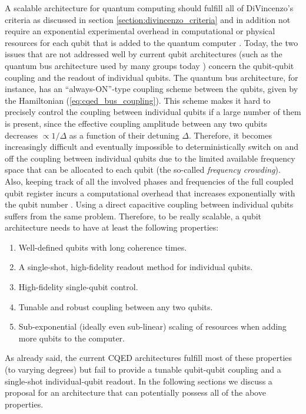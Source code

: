 A scalable architecture for quantum computing should fulfill all of DiVincenzo's criteria as discussed in section \ref{section:divincenzo_criteria} and in addition not require an exponential experimental overhead in computational or physical resources for each qubit that is added to the quantum computer \citep{blume-kohout_climbing_2002}. Today, the two issues that are not addressed well by current qubit architectures (such as the quantum bus architecture used by many groups today \citep{dicarlo_demonstration_2009,wallraff_strong_2004}) concern the qubit-qubit coupling and the readout of individual qubits. The quantum bus architecture, for instance, has an ``always-ON''-type coupling scheme between the qubits, given by the Hamiltonian (\ref{eq:cqed_bus_coupling}). This scheme makes it hard to precisely control the coupling between individual qubits if a large number of them is present, since the effective coupling amplitude between any two qubits decreases $\propto 1/\Delta$ as a function of their detuning $\Delta$. Therefore, it becomes increasingly difficult and eventually impossible to deterministically switch on and off the coupling between individual qubits due to the limited available frequency space that can be allocated to each qubit (the so-called {\it frequency crowding}). Also, keeping track of all the involved phases and frequencies of the full coupled qubit register incurs a computational overhead that increases exponentially with the qubit number \citep{galiautdinov_resonatorzero-qubit_2012}. Using a direct capacitive coupling between individual qubits suffers from the same problem. Therefore, to be really scalable, a qubit architecture needs to have at least the following properties:

\begin{enumerate}
\item Well-defined qubits with long coherence times.
\item A single-shot, high-fidelity readout method for individual qubits.
\item High-fidelity single-qubit control.
\item Tunable and robust coupling between any two qubits.
\item Sub-exponential (ideally even sub-linear) scaling of resources when adding more qubits to the computer.
\end{enumerate}

As already said, the current CQED architectures fulfill most of these properties (to varying degrees) but fail to provide a tunable qubit-qubit coupling and a single-shot individual-qubit readout. In the following sections we discuss a proposal for an architecture that can potentially possess all of the above properties.

